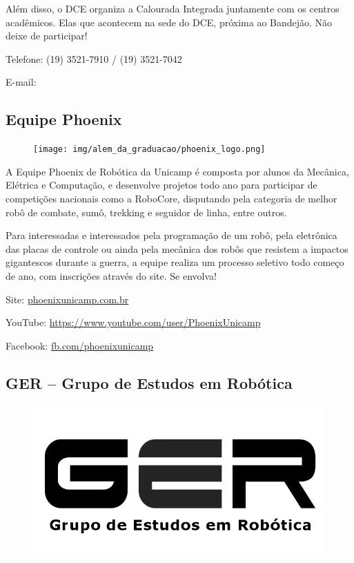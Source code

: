 Além disso, o DCE organiza a Calourada Integrada juntamente com os centros
acadêmicos. Elas que acontecem na sede do DCE, próxima ao Bandejão. Não deixe
de participar!

\begin{compactitemize}
\item Telefone: (19) 3521-7910 / (19) 3521-7042
\item E-mail: 
\end{compactitemize}

\subsection{Equipe Phoenix}

\begin{figure}[h!]
  \centering
  \texttt{[image: img/alem\_da\_graduacao/phoenix\_logo.png]}
\end{figure}

A Equipe Phoenix de Robótica da Unicamp é composta por alunos da Mecânica,
Elétrica e Computação, e desenvolve projetos todo ano para participar de
competições nacionais como a RoboCore, disputando pela categoria de melhor robô
de combate, sumô, trekking e seguidor de linha, entre outros.

Para interessadas e interessados pela programação de um robô,  pela eletrônica
das placas de controle ou ainda pela mecânica dos robôs que resistem a impactos
gigantescos durante a guerra, a equipe realiza um processo seletivo todo começo
de ano, com inscrições através do site. Se envolva!

\begin{compactitemize}
\item Site: \url{phoenixunicamp.com.br}
\item YouTube: \url{https://www.youtube.com/user/PhoenixUnicamp}
\item Facebook: \url{fb.com/phoenixunicamp}
\end{compactitemize}

\subsection{GER -- Grupo de Estudos em Robótica}

\begin{figure}[h!]
    \centering
    \includegraphics[width=.35\textwidth]{img/alem_da_graduacao/ger_logo.jpg}
\end{figure}

